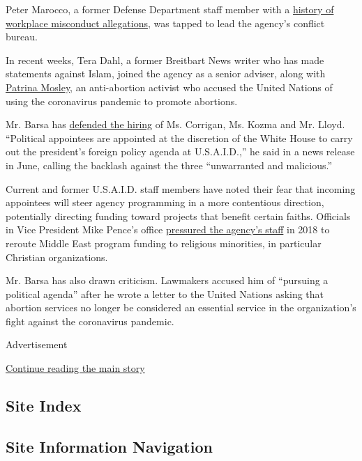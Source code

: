 Peter Marocco, a former Defense Department staff member with a
\href{https://www.politico.com/news/2020/07/08/usaid-chief-conflict-marocco-352010}{history
of workplace misconduct allegations}, was tapped to lead the agency's
conflict bureau.

In recent weeks, Tera Dahl, a former Breitbart News writer who has made
statements against Islam, joined the agency as a senior adviser, along
with
\href{https://foreignpolicy.com/2020/07/14/trump-anti-abortion-foreign-aid-development-white-house-installs-loyalist-usaid/}{Patrina
Mosley}, an anti-abortion activist who accused the United Nations of
using the coronavirus pandemic to promote abortions.

Mr. Barsa has
\href{https://www.usaid.gov/news-information/press-releases/jun-8-2020-statement-acting-administrator}{defended
the hiring} of Ms. Corrigan, Ms. Kozma and Mr. Lloyd. ``Political
appointees are appointed at the discretion of the White House to carry
out the president's foreign policy agenda at U.S.A.I.D.,'' he said in a
news release in June, calling the backlash against the three
``unwarranted and malicious.''

Current and former U.S.A.I.D. staff members have noted their fear that
incoming appointees will steer agency programming in a more contentious
direction, potentially directing funding toward projects that benefit
certain faiths. Officials in Vice President Mike Pence's office
\href{https://www.propublica.org/article/how-mike-pences-office-meddled-in-foreign-aid-to-reroute-money-to-favored-christian-groups}{pressured
the agency's staff} in 2018 to reroute Middle East program funding to
religious minorities, in particular Christian organizations.

Mr. Barsa has also drawn criticism. Lawmakers accused him of ``pursuing
a political agenda'' after he wrote a letter to the United Nations
asking that abortion services no longer be considered an essential
service in the organization's fight against the coronavirus pandemic.

Advertisement

\protect\hyperlink{after-bottom}{Continue reading the main story}

\hypertarget{site-index}{%
\subsection{Site Index}\label{site-index}}

\hypertarget{site-information-navigation}{%
\subsection{Site Information
Navigation}\label{site-information-navigation}}

